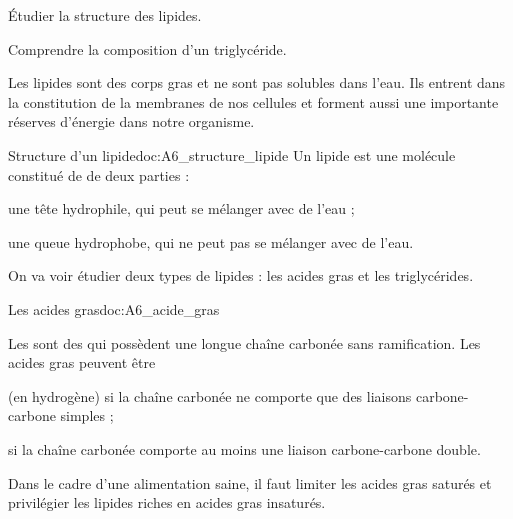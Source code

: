 \tetePremStssStru


\begin{objectifs}
  \item Étudier la structure des lipides.
  \item Comprendre la composition d'un triglycéride.
\end{objectifs}

\begin{contexte}
  Les lipides sont des corps gras et ne sont pas solubles dans l'eau.
  Ils entrent dans la constitution de la membranes de nos cellules et forment aussi une importante réserves d'énergie dans notre organisme.

\end{contexte}



\begin{doc}{Structure d'un lipide}{doc:A6_structure_lipide}
  Un lipide est une molécule constitué de de deux parties :
  \begin{listePoints}
    \item une tête hydrophile, qui peut se mélanger avec de l'eau ;
    \item une queue hydrophobe, qui ne peut pas se mélanger avec de l'eau.
  \end{listePoints}
  On va voir étudier deux types de lipides : les acides gras et les triglycérides.
\end{doc}

\begin{doc}{Les acides gras}{doc:A6_acide_gras}
  \begin{encart}
    Les  sont des  qui possèdent une longue chaîne carbonée sans ramification.
    Les acides gras peuvent être 
    \begin{listePoints}
      \item {} (en hydrogène) si la chaîne carbonée ne comporte que des liaisons carbone-carbone simples ;
      \item {} si la chaîne carbonée comporte au moins une liaison carbone-carbone double.
    \end{listePoints}
  \end{encart}
  
  \begin{center}

  \end{center}

  Dans le cadre d'une alimentation saine, il faut limiter les acides gras saturés et privilégier les lipides riches en acides gras insaturés.
\end{doc}

